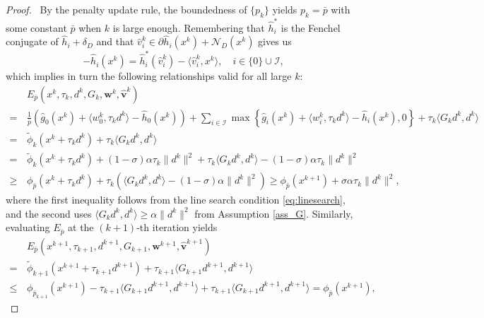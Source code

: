 \documentclass[11pt,a4paper]{article}
\def\hat{\widehat}\def\Hat{\widehat}
\theoremstyle{plain}
\begin{document}
\begin{proof}\,
By the penalty update rule, the boundedness of $\{p_k\}$ yields $p_k = \bar{p}$ with some constant $\bar{p}$ when $k$ is large enough. 
Remembering that $\hat{h}_i^*$ is the Fenchel conjugate of $\hat{h}_i + \delta_D$ and that $\hat{v}_i^k \in \partial \hat{h}_i(x^k) + \mathcal{N}_D(x^k)$ gives us
\begin{equation*}
-\hat{h}_i(x^k)=\hat{h}_i^*(\hat{v}_i^k)-\langle \hat{v}_i^k,x^k\rangle, \quad {i\in\{0\}\cup\mathcal I,}
\end{equation*}
which implies in turn the following relationships valid for all large $k$:
\begin{equation}\label{eq:E_k}
\begin{aligned}
& E_{\bar p}(x^k,\tau_k,d^k,G_k,{\mathbf{w}^k,\mathbf{\hat{v}}^k})\\
  =\, &\frac{1}{\bar p}\left(\hat{g}_0(x^k)+\langle w_0^k,\tau_kd^k\rangle-\hat h_0(x^k)\right)+{\sum_{i\in\mathcal I}}\max\left\{\hat g_i(x^k)+\langle w_i^k,\tau_kd^k\rangle-\hat h_i(x^k),0\right\}+ \tau_k \langle G_kd^k,d^k\rangle\\
  = \, &\tilde\phi_k(x^k+\tau_kd^k)+ \tau_k \langle G_kd^k,d^k\rangle\\
  = \, &\tilde\phi_k(x^k+\tau_kd^k)+{(1-\sigma)\alpha\tau_k\|d^k\|^2}+\tau_k\langle  G_kd^k,d^k\rangle-{(1-\sigma)\alpha\tau_k\|d^k\|^2}\\
  \geq\, &\phi_{\bar p}(x^k+\tau_kd^k)+\tau_k\left(\langle  G_kd^k,d^k\rangle-{(1-\sigma)\alpha}\|d^k\|^2\right) {\ge \phi_{\bar p}(x^{k+1}) + \sigma\alpha\tau_k\|d^k\|^2,}
\end{aligned} 
\end{equation}
where the first inequality follows from the line search condition \eqref{eq:linesearch}, and the second uses $\langle G_k d^k, d^k \rangle \ge \alpha\|d^k\|^2$ from Assumption \ref{ass_G}. Similarly, evaluating $E_{\bar p}$ at the $(k+1)$-th iteration yields
\begin{equation}\label{eq:E_k+1}
\begin{aligned}
&E_{\bar p}(x^{k+1},\tau_{k+1},d^{k+1},G_{k+1},{\mathbf{w}^{k+1},\mathbf{\hat{v}}^{k+1}})\\
  =\, &\tilde\phi_{k+1}(x^{k+1}+\tau_{k+1}d^{k+1}) +\tau_{k+1}\langle G_{k+1}d^{k+1},d^{k+1} \rangle\\
  \leq \,& \phi_{\bar p_{k+1}}(x^{k+1}) - \tau_{k+1}\langle G_{k+1}d^{k+1},d^{k+1} \rangle  +\tau_{k+1}\langle G_{k+1}d^{k+1},d^{k+1} \rangle  = \phi_{\bar p}(x^{k+1}),
\end{aligned} 

\end{equation}
\end{proof}
\end{document}
